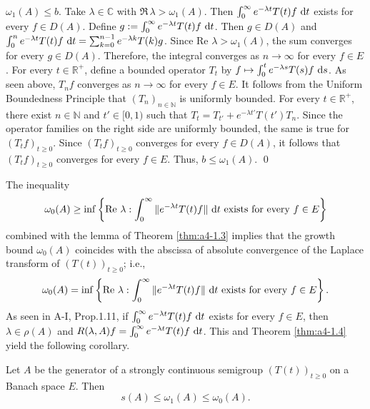 \(\omega_1(A) \leq b.
\)
Take \(\lambda \in \mathbb{C}\) with \(\Re\,\lambda > \omega_1(A)\). 
Then \(\int_0^\infty e^{-\lambda t} T(t) f \,\mathop{}\!\mathrm{d}{t}\) exists for every \(f \in D(A)\). 
Define \(g := \int_0^\infty e^{-\lambda t} T(t) f \,\mathop{}\!\mathrm{d}{t}\). 
Then \(g \in D(A)\) and \(\int_0^n e^{-\lambda t} T(t) f \,\mathop{}\!\mathrm{d}{t} = \sum_{k=0}^{n-1} e^{-\lambda k} T(k) g\). 
Since \(\text{Re } \lambda > \omega_1(A)\), the sum converges for every \(g \in D(A)\). 
Therefore, the integral converges as \(n \to \infty\) for every \(f \in E\).
For every \(t \in \mathbb{R}^+\), define a bounded operator \(T_t\) by \( f \mapsto \int_0^t e^{-\lambda s} T(s) f \,\mathop{}\!\mathrm{d}{s}\). 
As seen above, \(T_n f\) converges as \(n \to \infty\) for every \(f \in E\). 
It follows from the Uniform Boundedness Principle that \((T_n)_{n \in \mathbb{N}}\) is uniformly bounded.
\noindent
For every \(t \in \mathbb{R}^+\), there exist \(n \in \mathbb{N}\) and \(t' \in [0,1)\) such that \(T_t = T_{t'} + e^{-\lambda t'} T(t') T_n\). 
Since the operator families on the right side are uniformly bounded, the same is true for \((T_t f)_{t \geq 0}\). 
Since \((T_t f)_{t \geq 0}\) converges for every \(f \in D(A)\), it follows that \((T_t f)_{t \geq 0}\) converges for every \(f \in E\). 
Thus, \(b \leq \omega_1(A)\).
\hfill\qed

\medskip
\noindent
The inequality
\[
    \omega_0(A) \geq \inf \left\{ \text{Re } \lambda : \int_0^\infty \|e^{-\lambda t} T(t) f \| \,\mathop{}\!\mathrm{d}{t} 
    \text{ exists for every } f \in E \right\}
\]
combined with the lemma of Theorem \ref{thm:a4-1.3} implies that the growth bound \(\omega_0(A)\) coincides with the abscissa of absolute convergence of the Laplace transform of \((T(t))_{t \geq 0}\); i.e.,
\begin{equation}\label{eq:a4-1.6}
   \omega_0(A) = \inf \left\{ \text{Re } \lambda : \int_0^\infty \|e^{-\lambda t} T(t) f \| \,\mathop{}\!\mathrm{d}{t} \text{ exists for every } f \in E \right\}.
\end{equation}
\noindent
As seen in A-I, Prop.1.11, if \(\int_0^\infty e^{-\lambda t} T(t) f \,\mathop{}\!\mathrm{d}{t}\) exists for every \(f \in E\), then \(\lambda \in \rho(A)\) and \(R(\lambda, A) f = \int_0^\infty e^{-\lambda t} T(t) f \,\mathop{}\!\mathrm{d}{t}\). 
This and Theorem \ref{thm:a4-1.4} yield the following corollary.
\begin{corollary} \label{cor:a4-1.5} Let \( A \) be the generator of a strongly continuous semigroup \( (T(t))_{t \geq 0} \) on a Banach space \( E \). 
Then  
\[
s(A) \leq \omega_1(A) \leq \omega_0(A).
\]
\end{corollary}

